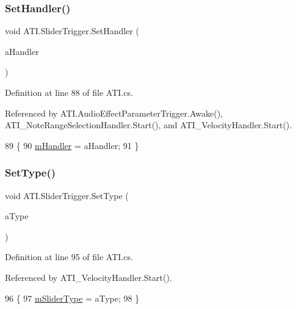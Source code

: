 \subsubsection{\texorpdfstring{Set\+Handler()}{SetHandler()}}
{\footnotesize\ttfamily void A\+T\+I.\+Slider\+Trigger.\+Set\+Handler (\begin{DoxyParamCaption}\item[{\hyperlink{class_a_t_i_1_1_slider_handler}{Slider\+Handler}}]{a\+Handler }\end{DoxyParamCaption})}



Definition at line 88 of file A\+T\+I.\+cs.



Referenced by A\+T\+I.\+Audio\+Effect\+Parameter\+Trigger.\+Awake(), A\+T\+I\+\_\+\+Note\+Range\+Selection\+Handler.\+Start(), and A\+T\+I\+\_\+\+Velocity\+Handler.\+Start().


\begin{DoxyCode}
89         \{
90             \hyperlink{class_a_t_i_1_1_slider_trigger_ab2c5ecc1828e1618dc7966aa815fdaba}{mHandler} = aHandler;
91         \}
\end{DoxyCode}
\mbox{\label{class_a_t_i_1_1_slider_trigger_a90347192aede3444d468ed2ab0d97f6c}} 
\subsubsection{\texorpdfstring{Set\+Type()}{SetType()}}
{\footnotesize\ttfamily void A\+T\+I.\+Slider\+Trigger.\+Set\+Type (\begin{DoxyParamCaption}\item[{\hyperlink{class_a_t_i_ac4c6056a99cbd16ff0d292d33b038b9b}{Slider\+Type}}]{a\+Type }\end{DoxyParamCaption})}



Definition at line 95 of file A\+T\+I.\+cs.



Referenced by A\+T\+I\+\_\+\+Velocity\+Handler.\+Start().


\begin{DoxyCode}
96         \{
97             \hyperlink{class_a_t_i_1_1_slider_trigger_a62a01bc9c41be54f58bd77664181fd5d}{mSliderType} = aType;
98         \}
\end{DoxyCode}


